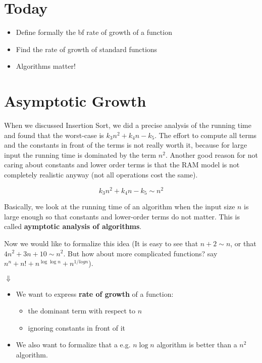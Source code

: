 \documentclass[11pt]{article}
\begin{document}
\section{Today}
\begin{itemize}
\item Define formally the {bf rate of growth} of a function
\item Find the rate of growth of standard functions
\item Algorithms matter!
\end{itemize}


\section{Asymptotic Growth}

When we discussed Insertion Sort, we did a precise analysis of the
running time and found that the worst-case is $k_3n^2 +k_4 n
-k_5$. The effort to compute all terms and the constants in front of
the terms is not really worth it, because for large input the running
time is dominated by the term $n^2$.
%
Another good reason for not caring about constants and lower order
terms is that the RAM model is not completely realistic anyway (not
all operations cost the same).

$$k_3n^2 +k_4 n - k_5 \sim n^2$$

Basically, we look at the running time of an algorithm when the input size $n$ is large enough so that constants and lower-order terms do not matter.  This is called {\bf aymptotic analysis of algorithms}. 

Now we would like to formalize this idea (It is easy to see that $n+2
\sim n$, or that $4n^2 + 3n +10 \sim n^2$. But how about more
complicated functions? say $n^n + n! + n ^{\log \log n} + n^{1/log n}$).


$\Downarrow$

\begin{itemize}
\item We want to express {\bf rate of growth} of a function:
  \begin{itemize}
  \item the dominant term with respect to $n$
  \item ignoring constants in front of it
  \end{itemize}

\item We also want to formalize that a e.g. $n\log n$ algorithm is better
than a $n^2$ algorithm.
\end{itemize}
\end{document}
